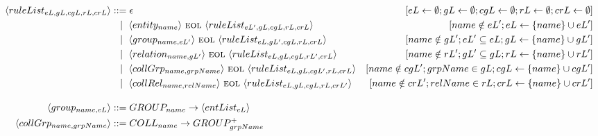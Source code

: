 \begin{landscape}
\begin{adjustbox}{max width=\linewidth,max height=.95\textheight,valign=c}
{\begin{align}
                \langle ruleList_{eL,gL,cgL,rL,crL}  \rangle & ::= \epsilon                                                                                                 & [eL \gets \emptyset; gL \gets \emptyset; cgL \gets \emptyset; rL \gets \emptyset; crL \gets \emptyset] \\
                                                             & ~~ \mid ~ \langle entity_{name}          \rangle ~\textsc{eol}~ \langle ruleList_{eL',gL,cgL,rL,crL} \rangle & [name \notin eL'; eL \gets \{name\} \cup eL']                                                          \\
                                                             & ~~ \mid ~ \langle group_{name, eL'}      \rangle ~\textsc{eol}~ \langle ruleList_{eL,gL',cgL,rL,crL} \rangle & [name \notin gL'; eL' \subseteq eL; gL \gets \{name\} \cup gL']                                        \\
                                                             & ~~ \mid ~ \langle relation_{name, gL'}   \rangle ~\textsc{eol}~ \langle ruleList_{eL,gL,cgL,rL',crL} \rangle & [name \notin rL'; gL' \subseteq gL; rL \gets \{name\} \cup rL']                                        \\
                                                             & ~~ \mid ~ \langle collGrp_{name,grpName} \rangle ~\textsc{eol}~ \langle ruleList_{eL,gL,cgL',rL,crL} \rangle & [name \notin cgL'; grpName \in gL; cgL \gets \{name\} \cup cgL']                                       \\
                                                             & ~~ \mid ~ \langle collRel_{name,relName} \rangle ~\textsc{eol}~ \langle ruleList_{eL,gL,cgL,rL,crL'} \rangle & [name \notin crL'; relName \in rL; crL \gets \{name\} \cup crL']                                       \\[1em]
                \langle group_{name, eL} \rangle             & ::= GROUP_{name} \to \langle entList_{eL} \rangle                                                                                                                                                                     \\
                \langle collGrp_{name,grpName} \rangle       & ::= COLL_{name} \to GROUP_{grpName}^+                                                                                                                                                                                 \\[1em]

\end{align}}
\end{adjustbox}
\end{landscape}
